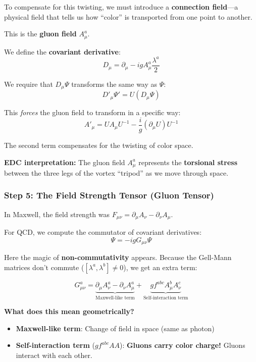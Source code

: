 To compensate for this twisting, we must introduce a \textbf{connection field}---a physical field that tells us how ``color'' is transported from one point to another.

This is the \textbf{gluon field} $A_\mu^a$.

We define the \textbf{covariant derivative}:
\begin{equation}
\boxed{D_\mu = \partial_\mu - ig A_\mu^a \frac{\lambda^a}{2}}
\end{equation}

We require that $D_\mu \Psi$ transforms the same way as $\Psi$:
\begin{equation}
D'_\mu \Psi' = U(D_\mu \Psi)
\end{equation}

This \textit{forces} the gluon field to transform in a specific way:
\begin{equation}
A'_\mu = U A_\mu U^{-1} - \frac{i}{g}(\partial_\mu U)U^{-1}
\end{equation}

The second term compensates for the twisting of color space.

\textbf{EDC interpretation:} The gluon field $A_\mu^a$ represents the \textbf{torsional stress} between the three legs of the vortex ``tripod'' as we move through space.

\subsubsection{Step 5: The Field Strength Tensor (Gluon Tensor)}

In Maxwell, the field strength was $F_{\mu\nu} = \partial_\mu A_\nu - \partial_\nu A_\mu$.

For QCD, we compute the commutator of covariant derivatives:
\begin{equation}
[D_\mu, D_\nu]\Psi = -ig G_{\mu\nu} \Psi
\end{equation}

Here the magic of \textbf{non-commutativity} appears. Because the Gell-Mann matrices don't commute ($[\lambda^a, \lambda^b] \neq 0$), we get an extra term:

\begin{equation}
\boxed{G_{\mu\nu}^a = \underbrace{\partial_\mu A_\nu^a - \partial_\nu A_\mu^a}_{\text{Maxwell-like term}} + \underbrace{g f^{abc} A_\mu^b A_\nu^c}_{\text{Self-interaction term}}}
\end{equation}

\textbf{What does this mean geometrically?}
\begin{itemize}
    \item \textbf{Maxwell-like term}: Change of field in space (same as photon)
    \item \textbf{Self-interaction term} ($gf^{abc}AA$): \textbf{Gluons carry color charge!} Gluons interact with each other.
\end{itemize}

